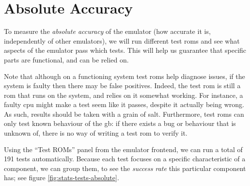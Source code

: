 \documentclass[11pt]{informatics-report}
\begin{document}
\section{Absolute Accuracy}

To measure the \textit{absolute accuracy} of the emulator (how accurate it is, independently of other emulators), we will run different test \glspl{rom} and see what aspects of the emulator pass which tests. This will help us guarantee that specific parts are functional, and can be relied on.

Note that although on a functioning system test \glspl{rom} help diagnose issues, if the system is faulty then there may be false positives. Indeed, the test \gls{rom} is still a \gls{rom} that runs on the system, and relies on it somewhat working. For instance, a faulty \gls{cpu} might make a test seem like it passes, despite it actually being wrong. As such, results should be taken with a grain of salt. Furthermore, test \glspl{rom} can only test known behaviour of the \gls{gb}: if there exists a bug or behaviour that is unknown of, there is no way of writing a test \gls{rom} to verify it.

Using the ``Test ROMs'' panel from the emulator frontend, we can run a total of 191 tests automatically. Because each test focuses on a specific characteristic of a component, we can group them, to see the \textit{success rate} this particular component has; see figure \ref{fig:stats-tests-absolute}.
\end{document}

